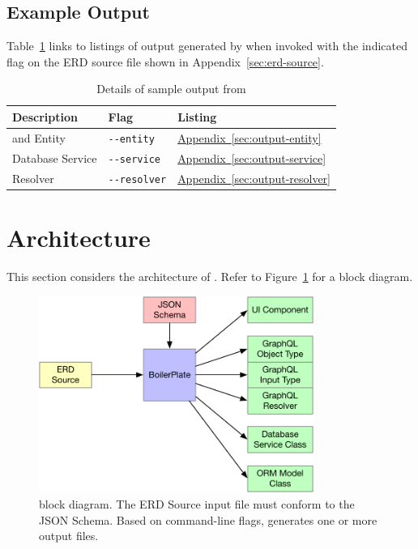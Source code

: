 \documentclass{article}
\begin{document}
\subsection{Example Output}
\label{sec:output}

Table~\ref{tab:sample-output}
links to listings of \ts{} output
generated by \boil{}
when invoked with the indicated flag
on the ERD source file
shown in Appendix~\ref{sec:erd-source}.

\begin{table}[h]
  \centering
  \begin{tabular}{lll}
    \toprule
    Description                  & Flag                  & Listing                                                            \\
    \midrule
    \typeorm{} and \gql{} Entity & \texttt{-{}-entity}   & \hyperref[sec:output-entity]{Appendix~\ref{sec:output-entity}}     \\
    \typeorm{} Database Service  & \texttt{-{}-service}  & \hyperref[sec:output-service]{Appendix~\ref{sec:output-service}}   \\
    \gql{} Resolver              & \texttt{-{}-resolver} & \hyperref[sec:output-resolver]{Appendix~\ref{sec:output-resolver}} \\
    \bottomrule
  \end{tabular}
  \caption{Details of sample output from \boil}
  \label{tab:sample-output}
\end{table}


\section{Architecture}
\label{sec:architecture}

This section considers the architecture of \boil.
Refer to Figure~\ref{fig:block-diagram} for a block diagram.

\begin{figure}[h]
  \centering
  \includegraphics[width=0.8\textwidth]{block-diagram}
  \caption{
    \boil{} block diagram.
    The \textsf{ERD Source} input file
    must conform to the \textsf{JSON Schema}.
    Based on command-line flags,
    \boil{} generates one or more output files.
  }
  \label{fig:block-diagram}
\end{figure}
\end{document}
